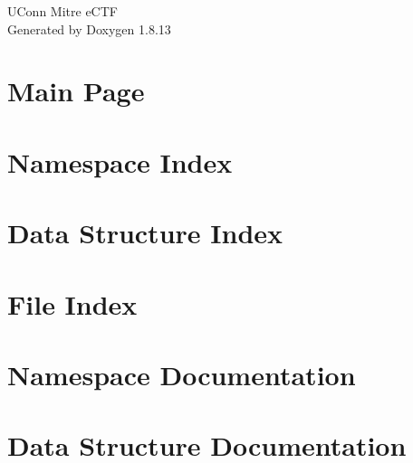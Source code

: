 \documentclass[twoside]{article}
\newcommand{\+}{\discretionary{\mbox{\scriptsize$\hookleftarrow$}}{}{}}
\begin{document}
\hypersetup{pageanchor=false,
             bookmarksnumbered=true,
             pdfencoding=unicode
            }
\begin{titlepage}
\vspace*{7cm}
\begin{center}%
{\Large U\+Conn Mitre e\+C\+TF }\\
\vspace*{1cm}
{\large Generated by Doxygen 1.8.13}\\
\end{center}
\end{titlepage}
\tableofcontents
{}
\hypersetup{pageanchor=true}

\section{Main Page}
\label{index}\hypertarget{index}{}
\section{Namespace Index}

\section{Data Structure Index}

\section{File Index}

\section{Namespace Documentation}








\section{Data Structure Documentation}









\end{document}

